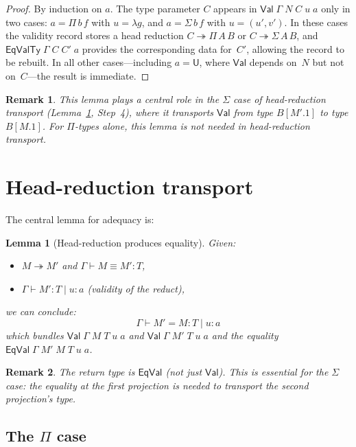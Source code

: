 \documentclass[11pt]{article}
\newcommand{\Type}{\mathsf{U}}
\newcommand{\Val}{\mathsf{Val}}
\newcommand{\EqVal}{\mathsf{EqVal}}
\newcommand{\EqValTy}{\mathsf{EqValTy}}
\newcommand{\HasType}{\vdash}
\newcommand{\ConvTm}{\equiv}
\newcommand{\HeadRed}{\twoheadrightarrow}
\newcommand{\pj}[2]{#1\mbox{.}#2}
\newtheorem{lemma}{Lemma}
\newtheorem{remark}{Remark}
\begin{document}
\begin{proof}
By induction on $a$.  The type parameter $C$ appears in $\Val\;\Gamma\;N\;C\;u\;a$
only in two cases: $a = \Pi\,b\,f$ with $u = \lambda g$, and
$a = \Sigma\,b\,f$ with $u = (u',v')$.  In these cases the validity
record stores a head reduction $C \HeadRed \Pi\,A\,B$
or $C \HeadRed \Sigma\,A\,B$, and $\EqValTy\;\Gamma\;C\;C'\;a$
provides the corresponding data for~$C'$, allowing
the record to be rebuilt.  In all other cases---including $a = \Type$,
where $\Val$ depends on~$N$ but not on~$C$---the result is immediate.
\end{proof}

\begin{remark}
This lemma plays a central role in the $\Sigma$ case of
head-reduction transport (Lemma~\ref{lem:headred}, Step~4), where it
transports $\Val$ from type $B[\pj{M'}{1}]$ to type $B[\pj{M}{1}]$.
For $\Pi$-types alone, this lemma is not needed in head-reduction transport.
\end{remark}

\section{Head-reduction transport}

The central lemma for adequacy is:

\begin{lemma}[Head-reduction produces equality]\label{lem:headred}
Given:
\begin{itemize}
\item $M \HeadRed M'$ and $\Gamma \HasType M \ConvTm M' : T$,
\item $\Gamma \HasType M' : T \mid u : a$ \quad (validity of the reduct),
\end{itemize}
we can conclude:
\[
  \Gamma \HasType M' = M : T \mid u : a
\]
which bundles $\Val\;\Gamma\;M\;T\;u\;a$ and $\Val\;\Gamma\;M'\;T\;u\;a$
and the equality $\EqVal\;\Gamma\;M'\;M\;T\;u\;a$.
\end{lemma}

\begin{remark}
The return type is $\EqVal$ (not just $\Val$).  This is essential
for the $\Sigma$ case: the equality at the first projection is needed to
transport the second projection's type.
\end{remark}

\subsection{The $\Pi$ case}
\end{document}
